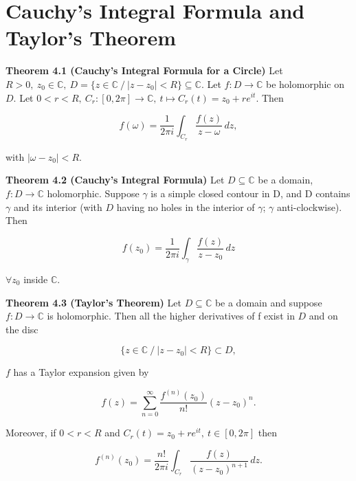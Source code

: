 \documentclass{article}
\begin{document}
\bigskip

\section{Cauchy's Integral Formula and Taylor's Theorem}

\textbf{Theorem 4.1 (Cauchy's Integral Formula for a Circle)} Let $R>0, \ z_0 \in \mathbb{C}, \ D = \{z \in \mathbb{C} \ / \ |z - z_0| < R\} \subseteq \mathbb{C}.$ Let $f:D \rightarrow \mathbb{C}$ be holomorphic on $D$. Let $0 < r < R, \ C_r:[0, 2\pi] \rightarrow \mathbb{C}, \ t \mapsto C_r(t) = z_0 + re^{it}$. Then 

\begin{equation}
    f(\omega) = \frac{1}{2\pi i} \int_{C_r} \frac{f(z)}{z-\omega} \, dz,
\end{equation}

with $|\omega - z_0| < R.$

\bigskip

\textbf{Theorem 4.2 (Cauchy's Integral Formula)} Let $D \subseteq \mathbb{C}$ be a domain, $f:D \rightarrow \mathbb{C}$ holomorphic. Suppose $\gamma$ is a simple closed contour in D, and D contains $\gamma$ and its interior (with $D$ having no holes in the interior of $\gamma$; $\gamma$ anti-clockwise). Then 

\begin{equation}
    f(z_0) = \frac{1}{2 \pi i} \int_{\gamma} \frac{f(z)}{z - z_0} \, dz
\end{equation}

$\forall z_0$ inside $\mathbb{C}.$

\textbf{Theorem 4.3 (Taylor's Theorem)} Let $D \subseteq \mathbb{C}$ be a domain and suppose $f:D \rightarrow \mathbb{C}$ is holomorphic. Then all the higher derivatives of f exist in $D$ and on the disc 

\begin{equation}
    \{z \in \mathbb{C} \ / \ |z - z_0| < R\} \subset D,
\end{equation}

$f$ has a Taylor expansion given by 

\begin{equation}
    f(z) = \sum_{n = 0}^{\infty} \frac{f^{(n)}(z_0)}{n!}(z - z_0)^{n}.
\end{equation}

Moreover,  if $0 < r < R$ and $C_r(t) = z_0 + re^{it}, \ t \in [0, 2\pi]$ then 

\begin{equation}
    f^{(n)}(z_0) = \frac{n!}{2 \pi i} \int_{C_r} \frac{f(z)}{(z - z_0)^{n+1}} \, dz.
\end{equation}
\end{document}
